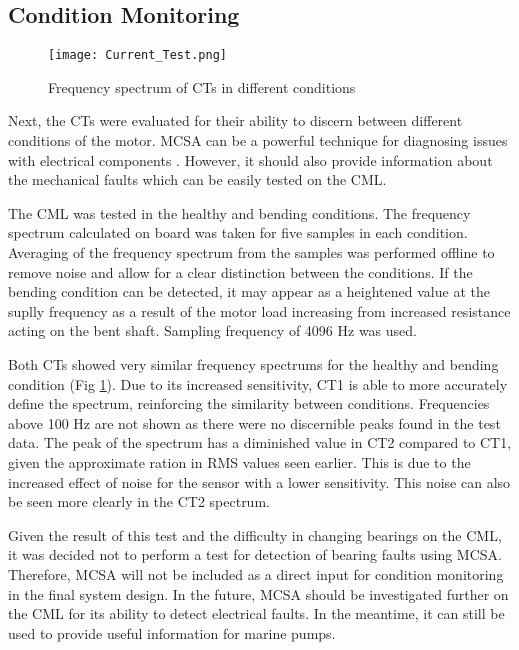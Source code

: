 \subsection{Condition Monitoring}

\begin{figure}
    \centering
    \texttt{[image: Current\_Test.png]}
    \caption{Frequency spectrum of CTs in different conditions}
    \label{fig:Current_Test}
\end{figure}

Next, the CTs were evaluated for their ability to discern between different conditions of the motor.
MCSA can be a powerful technique for diagnosing issues with electrical components \cite{MCSA_Review_Benbouzid}.
However, it should also provide information about the mechanical faults which can be easily tested on the CML.
\par

The CML was tested in the healthy and bending conditions.
The frequency spectrum calculated on board was taken for five samples in each condition.
Averaging of the frequency spectrum from the samples was performed offline to remove noise and allow for a clear distinction between the conditions.
If the bending condition can be detected, it may appear as a heightened value at the suplly frequency as a result of the motor load increasing from increased resistance acting on the bent shaft.
Sampling frequency of 4096 Hz was used.
\par

Both CTs showed very similar frequency spectrums for the healthy and bending condition (Fig \ref{fig:Current_Test}).
Due to its increased sensitivity, CT1 is able to more accurately define the spectrum, reinforcing the similarity between conditions.
Frequencies above 100 Hz are not shown as there were no discernible peaks found in the test data.
The peak of the spectrum has a diminished value in CT2 compared to CT1, given the approximate ration in RMS values seen earlier.
This is due to the increased effect of noise for the sensor with a lower sensitivity.
This noise can also be seen more clearly in the CT2 spectrum.
\par

Given the result of this test and the difficulty in changing bearings on the CML, it was decided not to perform a test for detection of bearing faults using MCSA.
Therefore, MCSA will not be included as a direct input for condition monitoring in the final system design.
In the future, MCSA should be investigated further on the CML for its ability to detect electrical faults.
In the meantime, it can still be used to provide useful information for marine pumps.



